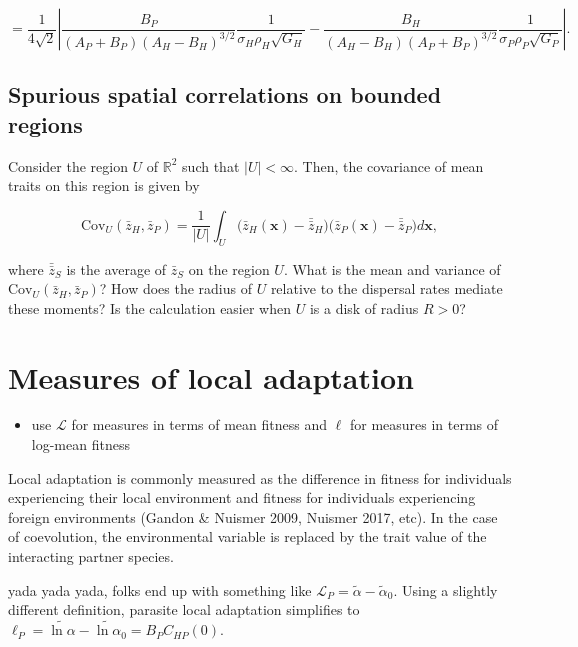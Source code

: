 \documentclass{article}
\begin{document}
\[=\frac{1}{4\sqrt2}\left|\frac{B_P}{(A_P+B_P)(A_H-B_H)^{3/2}}\frac{1}{\sigma_H\rho_H\sqrt{G_H}}-\frac{B_H}{(A_H-B_H)(A_P+B_P)^{3/2}}\frac{1}{\sigma_P\rho_P\sqrt{G_P}}\right|.\]

\hypertarget{spurious-spatial-correlations-on-bounded-regions}{%
\subsection{Spurious spatial correlations on bounded
regions}\label{spurious-spatial-correlations-on-bounded-regions}}

Consider the region \(U\) of \(\mathbb R^2\) such that \(|U|<\infty\).
Then, the covariance of mean traits on this region is given by

\[\mathrm{Cov}_U(\bar z_H,\bar z_P)=\frac{1}{|U|}\int_U\big(\bar z_H(\pmb x)-\bar{\bar z}_H\big)\big(\bar z_P(\pmb x)-\bar{\bar z}_P\big)d\pmb x,\]

where \(\bar{\bar z}_S\) is the average of \(\bar z_S\) on the region
\(U\). What is the mean and variance of
\(\mathrm{Cov}_U(\bar z_H,\bar z_P)\)? How does the radius of \(U\)
relative to the dispersal rates mediate these moments? Is the
calculation easier when \(U\) is a disk of radius \(R>0\)?

\hypertarget{measures-of-local-adaptation}{%
\section{\texorpdfstring{Measures of local adaptation
\label{la-app}}{Measures of local adaptation }}\label{measures-of-local-adaptation}}

\begin{itemize}
\tightlist
\item
  use \(\mathcal L\) for measures in terms of mean fitness and \(\ell\)
  for measures in terms of log-mean fitness
\end{itemize}

Local adaptation is commonly measured as the difference in fitness for
individuals experiencing their local environment and fitness for
individuals experiencing foreign environments (Gandon \& Nuismer 2009,
Nuismer 2017, etc). In the case of coevolution, the environmental
variable is replaced by the trait value of the interacting partner
species.

yada yada yada, folks end up with something like
\(\mathcal L_P=\tilde\alpha-\tilde\alpha_0\). Using a slightly different
definition, parasite local adaptation simplifies to
\(\ell_P=\widetilde{\ln\alpha}-\widetilde{\ln\alpha}_0=B_PC_{HP}(0)\).
\end{document}
